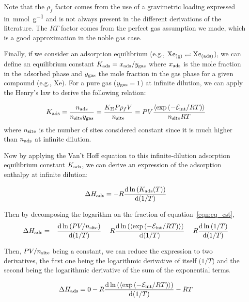 \documentclass[main.tex]{subfiles}
\begin{document}
Note that the $\rho_f$ factor comes from the use of a gravimetric loading expressed in~\si{\milli\mole\per\gram} and is not always present in the different derivations of the literature.\cite{PoreBlazer} The $RT$ factor comes from the perfect gas assumption we made, which is a good approximation in the noble gas case. 

Finally, if we consider an adsorption equilibrium (e.g., $\text{Xe}_{\text{(g)}} \rightleftharpoons \text{Xe}_{\text{(ads)}}$), we can define an equilibrium constant $K_{\text{ads}} = x_{\text{ads}}/y_{\text{gas}}$ where $x_{\text{ads}}$ is the mole fraction in the adsorbed phase and $y_{\text{gas}}$ the mole fraction in the gas phase for a given compound (e.g., Xe). For a pure gas ($y_{\text{gas}}=1$) at infinite dilution, we can apply the Henry's law to derive the following relation:

\begin{equation}\label{eqn:eq_cst}
  K_{\text{ads}} = \dfrac{n_{\text{ads}}}{n_{\text{site}}y_{\text{gas}}} = \dfrac{K_{\text{H}}P\rho_fV}{n_{\text{site}}} = PV \dfrac{\langle \exp\left(-\mathcal{E}_{\text{int}}/RT\right) \rangle}{n_{\text{site}}RT}
\end{equation}
where $n_{\text{site}}$ is the number of sites considered constant since it is much higher than $n_{\text{ads}}$ at infinite dilution.

Now by applying the Van't Hoff equation to this infinite-dilution adsorption equilibrium constant $K_{\text{ads}}$, we can derive an expression of the adsorption enthalpy at infinite dilution:

\begin{equation}
  \Delta H_{\text{ads}} = -R\dfrac{\mathop{}\mathopen{}\mathrm{d} \ln\left(K_{\text{ads}}(T)\right)}{\mathop{}\mathopen{}\mathrm{d} (1/T)}
\end{equation}

Then by decomposing the logarithm on the fraction of equation~\ref{eqn:eq_cst}, 
\begin{equation}
  \Delta H_{\text{ads}} = -\dfrac{\mathop{}\mathopen{}\mathrm{d} \ln\left(PV/n_{\text{site}}\right)}{\mathop{}\mathopen{}\mathrm{d} (1/T)} - R\dfrac{\mathop{}\mathopen{}\mathrm{d} \ln\left(\langle \exp\left(-\mathcal{E}_{\text{int}}/RT\right) \rangle\right)}{\mathop{}\mathopen{}\mathrm{d} (1/T)} - R\dfrac{\mathop{}\mathopen{}\mathrm{d} \ln\left(1/T\right)}{\mathop{}\mathopen{}\mathrm{d} (1/T)}
\end{equation}

Then, $PV/n_{\text{site}}$ being a constant, we can reduce the expression to two derivatives, the first one being the logarithmic derivative of itself ($1/T$) and the second being the logarithmic derivative of the sum of the exponential terms. 

\begin{equation}
  \Delta H_{\text{ads}} = 0 - R\dfrac{\mathop{}\mathopen{}\mathrm{d} \ln\left(\langle \exp\left(-\mathcal{E}_{\text{int}}/RT\right) \rangle\right)}{\mathop{}\mathopen{}\mathrm{d} (1/T)} - RT
\end{equation}
\end{document}
